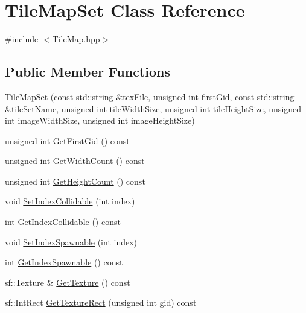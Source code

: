 \hypertarget{class_tile_map_set}{\section{Tile\-Map\-Set Class Reference}
\label{class_tile_map_set}
}


{\ttfamily \#include $<$Tile\-Map.\-hpp$>$}

\subsection*{Public Member Functions}
\begin{DoxyCompactItemize}
\item 
\hyperlink{class_tile_map_set_a34d33c801d9c62d9c95049c270e83002}{Tile\-Map\-Set} (const std\-::string \&tex\-File, unsigned int first\-Gid, const std\-::string \&tile\-Set\-Name, unsigned int tile\-Width\-Size, unsigned int tile\-Height\-Size, unsigned int image\-Width\-Size, unsigned int image\-Height\-Size)
\item 
unsigned int \hyperlink{class_tile_map_set_a510130a6caf01a72483600ce6497a2b3}{Get\-First\-Gid} () const 
\item 
unsigned int \hyperlink{class_tile_map_set_a31f0031164701fe7d98dc7683e6c35f5}{Get\-Width\-Count} () const 
\item 
unsigned int \hyperlink{class_tile_map_set_a33bf48147ee5eb77efbfd45da82f60ee}{Get\-Height\-Count} () const 
\item 
void \hyperlink{class_tile_map_set_a9c14b329f61709654953c7978065778a}{Set\-Index\-Collidable} (int index)
\item 
int \hyperlink{class_tile_map_set_ad3aa4aadee0b9686dc7a03beb7604203}{Get\-Index\-Collidable} () const 
\item 
void \hyperlink{class_tile_map_set_a477cc5c81ce119e7611270448dbe73fa}{Set\-Index\-Spawnable} (int index)
\item 
int \hyperlink{class_tile_map_set_aaedc48df137fa504bf4911e6cf31e63a}{Get\-Index\-Spawnable} () const 
\item 
sf\-::\-Texture \& \hyperlink{class_tile_map_set_a903f3babc3298ec0d91208cb1a0a476a}{Get\-Texture} () const 
\item 
sf\-::\-Int\-Rect \hyperlink{class_tile_map_set_a3ffb31b962f96260211537f5c8256db3}{Get\-Texture\-Rect} (unsigned int gid) const 
\end{DoxyCompactItemize}
